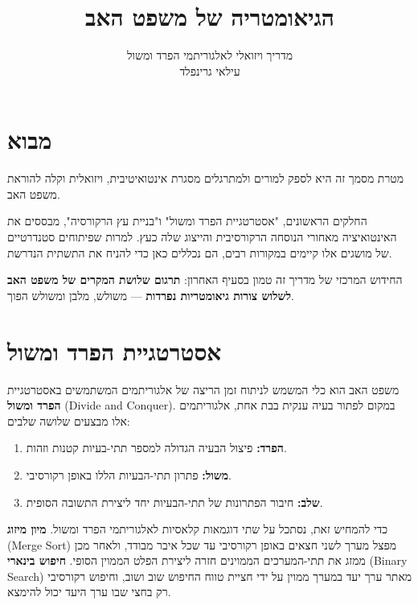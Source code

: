 \documentclass[11pt, a4paper]{article}
\title{\Huge \textbf{הגיאומטריה של משפט האב}}
\author{\Large מדריך ויזואלי לאלגוריתמי הפרד ומשול \\ \vspace{0.2cm} \large עילאי גרינפלד}
\date{}
\begin{document}
\maketitle

\section*{מבוא}

מטרת מסמך זה היא לספק למורים ולמתרגלים מסגרת אינטואיטיבית, ויזואלית וקלה להוראת משפט האב.

החלקים הראשונים, "אסטרטגיית הפרד ומשול" ו"בניית עץ הרקורסיה", מבססים את האינטואיציה מאחורי הנוסחה הרקורסיבית והייצוג שלה כעץ. למרות שפיתוחים סטנדרטיים של מושגים אלו קיימים במקורות רבים, הם נכללים כאן כדי להניח את התשתית הנדרשת.

החידוש המרכזי של מדריך זה טמון בסעיף האחרון: \textbf{תרגום שלושת המקרים של משפט האב לשלוש צורות גיאומטריות נפרדות} — משולש, מלבן ומשולש הפוך.


\section*{אסטרטגיית הפרד ומשול}

משפט האב הוא כלי המשמש לניתוח זמן הריצה של אלגוריתמים המשתמשים באסטרטגיית \textbf{הפרד ומשול} (\textenglish{Divide and Conquer}). במקום לפתור בעיה ענקית בבת אחת, אלגוריתמים אלו מבצעים שלושה שלבים:
\begin{enumerate}
    \item \textbf{הפרד:} פיצול הבעיה הגדולה למספר תתי-בעיות קטנות וזהות.
    \item \textbf{משול:} פתרון תתי-הבעיות הללו באופן רקורסיבי.
    \item \textbf{שלב:} חיבור הפתרונות של תתי-הבעיות יחד ליצירת התשובה הסופית.
\end{enumerate}

כדי להמחיש זאת, נסתכל על שתי דוגמאות קלאסיות לאלגוריתמי הפרד ומשול. \textbf{מיון מיזוג} (\textenglish{Merge Sort}) מפצל מערך לשני חצאים באופן רקורסיבי עד שכל איבר מבודד, ולאחר מכן ממזג את תתי-המערכים הממוינים חזרה ליצירת הפלט הממוין הסופי. \textbf{חיפוש בינארי} (\textenglish{Binary Search}) מאתר ערך יעד במערך ממוין על ידי חציית טווח החיפוש שוב ושוב, וחיפוש רקורסיבי רק בחצי שבו ערך היעד יכול להימצא.
\end{document}
